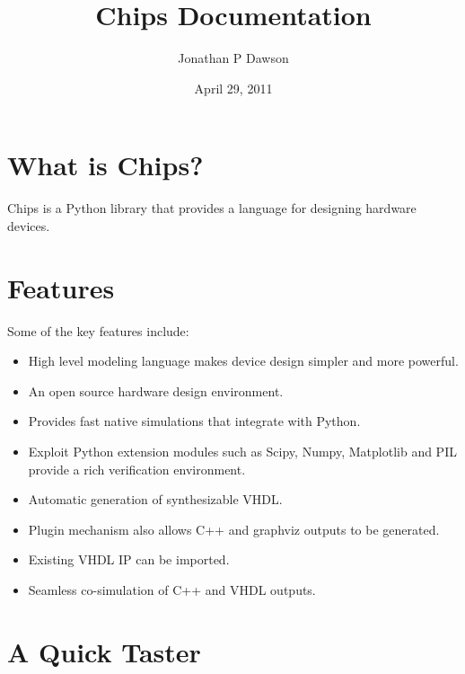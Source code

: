 \documentclass[letterpaper,10pt,english]{manual}
\title{Chips Documentation}
\date{April 29, 2011}
\author{Jonathan P Dawson}
\begin{document}
\maketitle
\tableofcontents
\hypertarget{--doc-index}{}



\chapter{What is Chips?}

Chips is a Python library that provides a language for designing hardware
devices.


\chapter{Features}

Some of the key features include:
\begin{itemize}
\item {} 
High level modeling language makes device design simpler and more
powerful.

\item {} 
An open source hardware design environment.

\item {} 
Provides fast native simulations that integrate with Python.

\item {} 
Exploit Python extension modules such as Scipy, Numpy, Matplotlib and PIL
provide a rich verification environment.

\item {} 
Automatic generation of synthesizable VHDL.

\item {} 
Plugin mechanism also allows C++ and graphviz outputs to be generated.

\item {} 
Existing VHDL IP can be imported.

\item {} 
Seamless co-simulation of C++ and VHDL outputs.

\end{itemize}


\chapter{A Quick Taster}
\end{document}
